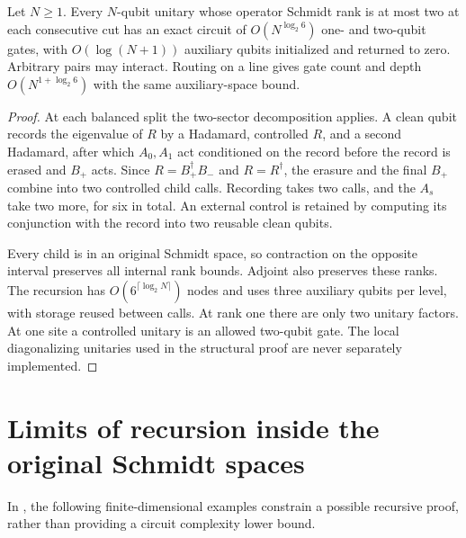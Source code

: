 \begin{lemma}
    \label{thm:mpu_rank_two_exact_circuits}
    Let $N\geq1$. Every $N$-qubit unitary whose operator Schmidt rank
    is at most two at each consecutive cut has an exact circuit of
    $O(N^{\log_2 6})$ one- and two-qubit gates, with
    $O(\log(N+1))$ auxiliary qubits initialized and returned to zero.
    Arbitrary pairs may interact. Routing on a line gives gate count
    and depth $O(N^{1+\log_2 6})$ with the same auxiliary-space bound.
\end{lemma}
\begin{proof}
    At each balanced split the two-sector decomposition applies.
    A clean qubit records the eigenvalue of $R$ by a Hadamard,
    controlled $R$, and a second Hadamard, after which $A_0,A_1$ act conditioned
    on the record before the record is erased and $B_+$ acts.
    Since $R=B_+^\dagger B_-$ and $R=R^\dagger$, the erasure and the
    final $B_+$ combine into two controlled child calls. Recording
    takes two calls, and the $A_s$ take two more, for six in total.
    An external control is retained by computing its conjunction with
    the record into two reusable clean qubits.

    Every child is in an original Schmidt space, so contraction on the
    opposite interval preserves all internal rank bounds.
    Adjoint also preserves these ranks. The recursion has
    $O(6^{\lceil\log_2N\rceil})$ nodes and uses three auxiliary qubits
    per level, with storage reused between calls. At rank one there are
    only two unitary factors. At one site a controlled unitary is an
    allowed two-qubit gate. The local diagonalizing unitaries used in
    the structural proof are never separately implemented.
\end{proof}

\section{Limits of recursion inside the original Schmidt spaces}

In \cite{MPUSchmidtObstructions2026}, the following finite-dimensional
examples constrain a possible recursive
proof, rather than providing a circuit complexity lower bound.

